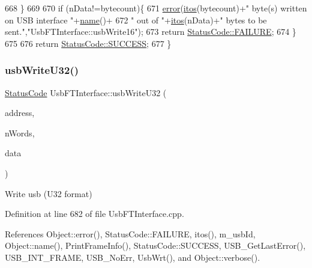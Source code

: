 \begin{DoxyCode}
668   \}
669 
670   \textcolor{keywordflow}{if} (nData!=bytecount)\{
671     \hyperlink{classObject_a204a95f57818c0f811933917a30eff45}{error}(\hyperlink{Tools_8h_af330027dbdafb9a30768b3613c553e60}{itos}(bytecount)+\textcolor{stringliteral}{" byte(s) written on USB interface "}+\hyperlink{classObject_a300f4c05dd468c7bb8b3c968868443c1}{name}()+
672             \textcolor{stringliteral}{" out of "}+\hyperlink{Tools_8h_af330027dbdafb9a30768b3613c553e60}{itos}(nData)+\textcolor{stringliteral}{" bytes to be sent."},\textcolor{stringliteral}{"UsbFTInterface::usbWrite16"});
673     \textcolor{keywordflow}{return} \hyperlink{classStatusCode_a6f565cbeadc76d14c72f047e5e85eb4ba3da73d4c469762eb9d3c960368252b26}{StatusCode::FAILURE};    
674   \}
675 
676   \textcolor{keywordflow}{return} \hyperlink{classStatusCode_a6f565cbeadc76d14c72f047e5e85eb4badd0da38d3ba0d922efd1f4619bc37ad8}{StatusCode::SUCCESS};  
677 \}
\end{DoxyCode}
\mbox{\label{classUsbFTInterface_ac5eac42e444c9b0f19f0f70598c51b20}} 
\subsubsection{\texorpdfstring{usb\+Write\+U32()}{usbWriteU32()}}
{\footnotesize\ttfamily \hyperlink{classStatusCode}{Status\+Code} Usb\+F\+T\+Interface\+::usb\+Write\+U32 (\begin{DoxyParamCaption}\item[{unsigned long int}]{address,  }\item[{unsigned long int}]{n\+Words,  }\item[{unsigned long $\ast$}]{data }\end{DoxyParamCaption})}

Write usb (U32 format) 

Definition at line 682 of file Usb\+F\+T\+Interface.\+cpp.



References Object\+::error(), Status\+Code\+::\+F\+A\+I\+L\+U\+RE, itos(), m\+\_\+usb\+Id, Object\+::name(), Print\+Frame\+Info(), Status\+Code\+::\+S\+U\+C\+C\+E\+SS, U\+S\+B\+\_\+\+Get\+Last\+Error(), U\+S\+B\+\_\+\+I\+N\+T\+\_\+\+F\+R\+A\+ME, U\+S\+B\+\_\+\+No\+Err, Usb\+Wrt(), and Object\+::verbose().



